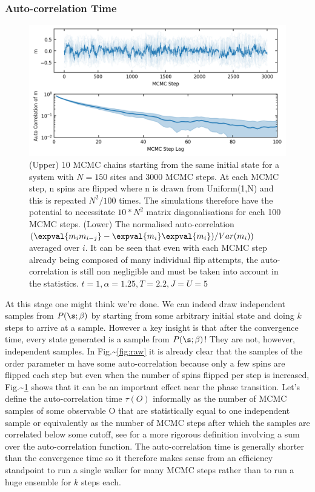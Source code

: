 \hypertarget{auto-correlation-time}{%
\subsubsection{Auto-correlation Time}\label{auto-correlation-time}}

\begin{figure}
\hypertarget{fig:m_autocorr}{%
\centering
\includegraphics[width=1\textwidth,height=\textheight]{figure_code/fk_chapter/lsr/figs/m_autocorr.png}
\caption[no title]{(Upper) 10 MCMC chains starting from the same initial state for
a system with \(N = 150\) sites and 3000 MCMC steps. At each MCMC step,
n spins are flipped where n is drawn from Uniform(1,N) and this is
repeated \(N^2/100\) times. The simulations therefore have the potential
to necessitate \(10*N^2\) matrix diagonalisations for each 100 MCMC
steps. (Lower) The normalised auto-correlation
\((\expval{m_i m_{i-j}} - \expval{m_i}\expval{m_i}) / Var(m_i))\)
averaged over \(i\). It can be seen that even with each MCMC step
already being composed of many individual flip attempts, the
auto-correlation is still non negligible and must be taken into account
in the statistics.
\(t = 1, \alpha = 1.25, T = 2.2, J = U = 5\)}\label{fig:m_autocorr}
}
\end{figure}

At this stage one might think we're done. We can indeed draw independent samples from \(P(\s; \beta)\) by starting from some arbitrary initial state and doing \(k\) steps to arrive at a sample. However a key insight is that after the convergence time, every state generated is a sample from \(P(\s; \beta)\)! They are not, however, independent samples. In Fig.\textasciitilde{}\ref{fig:raw} it is already clear that the samples of the order parameter m have some auto-correlation because only a few spins are flipped each step but even when the number of spins flipped per step is increased, Fig.\textasciitilde{}\ref{fig:m_autocorr} shows that it can be an important effect near the phase transition. Let's define the auto-correlation time \(\tau(O)\) informally as the number of MCMC samples of some observable O that are statistically equal to one independent sample or equivalently as the number of MCMC steps after which the samples are correlated below some cutoff, see \autocite{krauthIntroductionMonteCarlo1996} for a more rigorous definition involving a sum over the auto-correlation function. The auto-correlation time is generally shorter than the convergence time so it therefore makes sense from an efficiency standpoint to run a single walker for many MCMC steps rather than to run a huge ensemble for \(k\) steps each.

